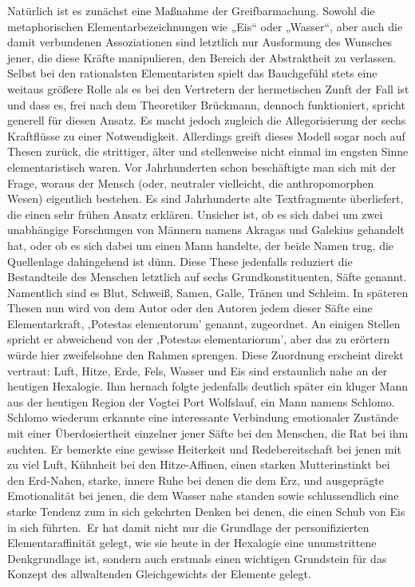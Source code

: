 \documentclass[a5paper,8pt]{book}
\begin{document}
Natürlich ist es zunächst eine Maßnahme der Greifbarmachung. Sowohl die metaphorischen Elementarbezeichnungen wie „Eis“ oder „Wasser“, aber auch die damit verbundenen 
Assoziationen sind letztlich nur Ausformung des Wunsches jener, die diese Kräfte manipulieren, den Bereich der Abstraktheit zu verlassen. Selbst bei den rationalsten 
Elementaristen spielt das Bauchgefühl stets eine weitaus größere Rolle als es bei den Vertretern der hermetischen Zunft der Fall ist und dass es, frei nach dem Theoretiker 
Brückmann, dennoch funktioniert, spricht generell für diesen Ansatz. Es macht jedoch zugleich die Allegorisierung der sechs Kraftflüsse zu einer Notwendigkeit.
Allerdings greift dieses Modell sogar noch auf Thesen zurück, die strittiger, älter und stellenweise nicht einmal im engsten Sinne elementaristisch waren. Vor Jahrhunderten 
schon beschäftigte man sich mit der Frage, woraus der Mensch (oder, neutraler vielleicht, die anthropomorphen Wesen) eigentlich bestehen. Es sind Jahrhunderte alte Textfragmente 
überliefert, die einen sehr frühen Ansatz erklären. Unsicher ist, ob es sich dabei um zwei unabhängige Forschungen von Männern namens Akragas und Galekius gehandelt hat, oder ob 
es sich dabei um einen Mann handelte, der beide Namen trug, die Quellenlage dahingehend ist dünn. Diese These jedenfalls reduziert die Bestandteile des Menschen letztlich auf 
sechs Grundkonstituenten, Säfte genannt. Namentlich sind es Blut, Schweiß, Samen, Galle, Tränen und Schleim. In späteren Thesen nun wird von dem Autor oder den Autoren jedem 
dieser Säfte eine Elementarkraft, ‚Potestas elementorum’ genannt, zugeordnet. An einigen Stellen spricht er abweichend von der ‚Potestas elementariorum’, aber das zu erörtern 
würde hier zweifelsohne den Rahmen sprengen. Diese Zuordnung erscheint direkt vertraut: Luft, Hitze, Erde, Fels, Wasser und Eis sind erstaunlich nahe an der heutigen Hexalogie.
Ihm hernach folgte jedenfalls deutlich später ein kluger Mann aus der heutigen Region der Vogtei Port Wolfslauf, ein Mann namens Schlomo. Schlomo wiederum erkannte eine 
interessante Verbindung emotionaler Zustände mit einer Überdosiertheit einzelner jener Säfte bei den Menschen, die Rat bei ihm suchten. Er bemerkte eine gewisse Heiterkeit und 
Redebereitschaft bei jenen mit zu viel Luft, Kühnheit bei den Hitze-Affinen, einen starken Mutterinstinkt bei den Erd-Nahen, starke, innere Ruhe bei denen die dem Erz, und 
ausgeprägte Emotionalität bei jenen, die dem Wasser nahe standen sowie schlussendlich eine starke Tendenz zum in sich gekehrten Denken bei denen, die einen Schub von Eis in 
sich führten.\
Er hat damit nicht nur die Grundlage der personifizierten Elementaraffinität gelegt, wie sie heute in der Hexalogie eine unumstrittene Denkgrundlage ist, sondern auch erstmals 
einen wichtigen Grundstein für das Konzept des allwaltenden Gleichgewichts der Elemente gelegt.\\
\end{document}

